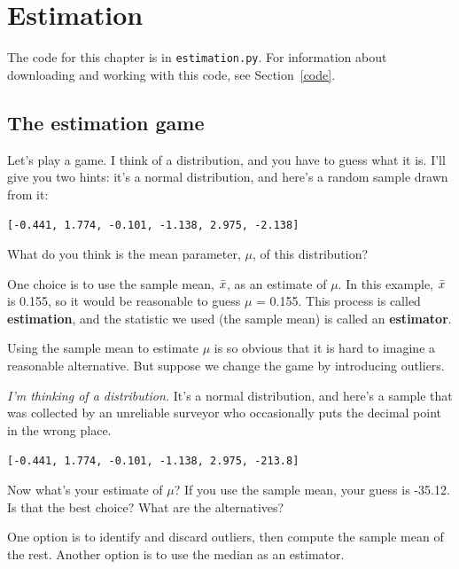 \documentclass[12pt]{book}
\begin{document}
\chapter{Estimation}
\label{estimation}

The code for this chapter is in \verb"estimation.py".  For information
about downloading and working with this code, see Section~\ref{code}.


\section{The estimation game}

Let's play a game.  I think of a distribution, and you have to guess
what it is.  I'll give you two hints: it's a
normal distribution, and here's a random sample drawn from it:

\verb"[-0.441, 1.774, -0.101, -1.138, 2.975, -2.138]"

What do you think is the mean parameter, $\mu$, of this distribution?

One choice is to use the sample mean, $\bar{x}$, as an estimate of $\mu$.
In this example, $\bar{x}$ is 0.155, so it would
be reasonable to guess $\mu$ = 0.155.
This process is called {\bf estimation}, and the statistic we used
(the sample mean) is called an {\bf estimator}.

Using the sample mean to estimate $\mu$ is so obvious that it is hard
to imagine a reasonable alternative.  But suppose we change the game by
introducing outliers.

{\em I'm thinking of a distribution.\/}  It's a normal distribution, and
here's a sample that was collected by an unreliable surveyor who
occasionally puts the decimal point in the wrong place.

\verb"[-0.441, 1.774, -0.101, -1.138, 2.975, -213.8]"

Now what's your estimate of $\mu$?  If you use the sample mean, your
guess is -35.12.  Is that the best choice?  What are the alternatives?

One option is to identify and discard outliers, then compute the sample
mean of the rest.  Another option is to use the median as an estimator.
\end{document}
